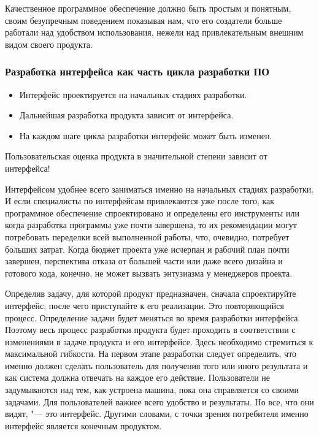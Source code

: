 \documentclass{../industrial-development}
\begin{document}
Качественное программное обеспечение должно быть простым и понятным, своим безупречным поведением показывая нам, что его создатели больше работали над удобством использования, нежели над привлекательным внешним видом своего продукта.~\cite[с.~5--6]{Raskin}

\begin{frame} \frametitle{Разработка интерфейса как часть цикла разработки ПО}
  \begin{itemize}
  \item Интерфейс проектируется на начальных стадиях разработки.
  \item Дальнейшая разработка продукта зависит от интерфейса.
  \item На каждом шаге цикла разработки интерфейс может быть изменен.
  \end{itemize}
  
  \begin{block}{}
    Пользовательская оценка продукта в значительной степени зависит от интерфейса!
  \end{block}
\end{frame}

\lecturenotes

Интерфейсом удобнее всего заниматься именно на начальных стадиях разработки. И если специалисты по интерфейсам привлекаются уже после того, как программное обеспечение спроектировано и определены его инструменты или когда разработка программы уже почти завершена, то их рекомендации могут потребовать переделки всей выполненной работы, что, очевидно, потребует больших затрат. Когда бюджет проекта уже исчерпан и рабочий план почти завершен, перспектива отказа от большей части или даже всего дизайна и готового кода, конечно, не может вызвать энтузиазма у менеджеров проекта. 

Определив задачу, для которой продукт предназначен, сначала спроектируйте интерфейс, после чего приступайте к его реализации. Это повторяющийся процесс. Определение задачи будет меняться во время разработки интерфейса. Поэтому весь процесс разработки продукта будет проходить в соответствии с изменениями в задаче продукта и его интерфейсе. Здесь необходимо стремиться к максимальной гибкости. На первом этапе разработки следует определить, что именно должен сделать пользователь для получения того или иного результата и как система должна отвечать на каждое его действие. Пользователи не задумываются над тем, как устроена машина, пока она справляется со своими задачами. Для пользователей важнее всего удобство и результаты. Но все, что они видят, "--- это интерфейс. Другими словами, с точки зрения потребителя именно интерфейс является конечным продуктом.~\cite[с.~7--8]{Raskin}
\end{document}
